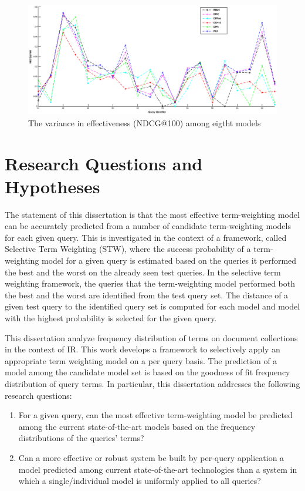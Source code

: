 \begin{figure}[!t]
\centering
\includegraphics[width=\textwidth]{variance.eps}
\caption{The variance in effectiveness (NDCG@100) among eigtht models}
\label{fig1}
\end{figure}


\section{Research Questions and Hypotheses}
\label{1.3}

The statement of this dissertation is that the most effective term-weighting model can be accurately predicted from a number of candidate term-weighting models for each given query.
This is investigated in the context of a framework, called Selective Term Weighting (STW), where the success probability of a term-weighting model for a given query is estimated based on the queries it performed the best and the worst on the already seen test queries.
In the selective term weighting framework, the queries that the term-weighting model performed both the best and the worst are identified from the test query set.
The distance of a given test query to the identified query set is computed for each model and model with the highest probability is selected for the given query.

This dissertation analyze frequency distribution of terms on document collections in the context of IR.
This work develops a framework to selectively apply an appropriate term weighting model on a per query basis.
The prediction of a model among the candidate model set is based on the goodness of fit frequency distribution of query terms.
In particular, this dissertation addresses the following research questions:

\begin{enumerate}[label=\ac R\arabic*\kapa]
  \item For a given query, can the most effective term-weighting model be predicted among the current state-of-the-art models based on the frequency distributions of the queries' terms?
  \item Can a more effective or robust system be built by per-query application a model predicted among current state-of-the-art technologies than a system in which a single/individual model is uniformly applied to all queries? 
\end{enumerate}

